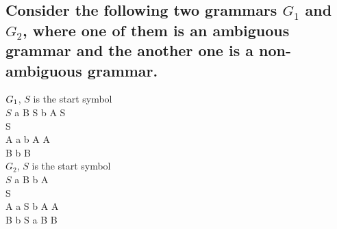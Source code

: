 \documentclass[a4paper]{exam}
\begin{document}
\subsection{Consider the following two grammars $G_1$ and $G_2$, where one of them is an ambiguous grammar and the another one is a non-ambiguous grammar.}
\begin{multicols}{2}
$\\G_1$, $S$ is the start symbol\\
$S$ \rightarrow a B S \mid b A S \\
S \rightarrow \varepsilon \\
A \rightarrow a \mid b A A \\
B \rightarrow b \mid {} B\\
$G_2$, $S$ is the start symbol\\
$S$ \rightarrow a B \mid b A \\
S \rightarrow \varepsilon \\
A \rightarrow a S \mid b A A \\
B \rightarrow b S \mid a B B
\end{multicols}
\end{document}
